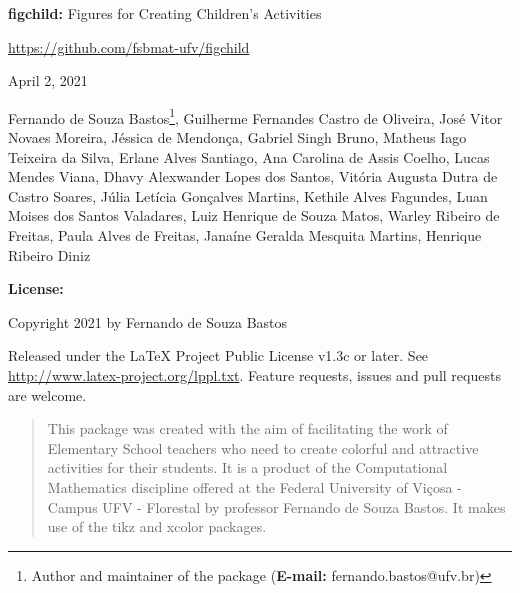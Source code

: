 \documentclass{article}
\begin{document}
\begin{titlepage}

\begin{center}

\textbf{figchild:} Figures for Creating Children's Activities

\vspace{0.5cm}

\url{https://github.com/fsbmat-ufv/figchild}

\vspace{0.5cm}

April 2, 2021

\end{center}

\vspace{2cm}



 Fernando de Souza Bastos\footnote{Author and maintainer of the package (\textbf{E-mail:} fernando.bastos@ufv.br)}, 
 Guilherme Fernandes Castro de Oliveira, 
 José Vitor Novaes Moreira,
 Jéssica de Mendonça,
 Gabriel Singh Bruno,
 Matheus Iago Teixeira da Silva,
 Erlane Alves Santiago,
 Ana Carolina de Assis Coelho,
 Lucas Mendes Viana,
 Dhavy Alexwander Lopes dos Santos,
 Vitória Augusta Dutra de Castro Soares,
 Júlia Letícia Gonçalves Martins,
 Kethile Alves Fagundes,
 Luan Moises dos Santos Valadares,
 Luiz Henrique de Souza Matos,
 Warley Ribeiro de Freitas,
 Paula Alves de Freitas,
 Janaíne Geralda Mesquita Martins,
 Henrique Ribeiro Diniz
 
\vspace{3cm}

\noindent \textbf{License:}

\vspace{1cm}

\noindent Copyright 2021 by Fernando de Souza Bastos

\vspace{1cm}

\noindent Released under the LaTeX Project Public License v1.3c or later. See \url{http://www.latex-project.org/lppl.txt}. Feature requests, issues and pull requests are welcome.

\end{titlepage}

\begin{abstract}
This package was created with the aim of facilitating the work of Elementary School teachers who need to create colorful and attractive activities for their students. It is a product of the Computational Mathematics discipline offered at the Federal University of Viçosa - Campus UFV - Florestal by professor Fernando de Souza Bastos. It makes use of the tikz and xcolor packages.
\end{abstract}
\end{document}
